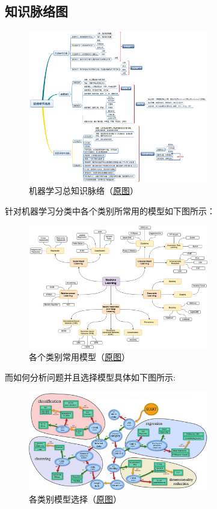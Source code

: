 \documentclass[lang=cn,11pt,a4paper]{eleganttemplate}
\begin{document}
\subsection{知识脉络图}
\begin{figure}[htbp]
  \centering
  \includegraphics[width=0.7\textwidth]{image/ML-1.png}
  \caption{机器学习总知识脉络（\href{https://www.cnblogs.com/wnwin/p/9684520.html}{原图}）}
\end{figure}
针对机器学习分类中各个类别所常用的模型如下图所示：
\begin{figure}[htbp]
  \centering
  \vspace{0cm}
  \includegraphics[width=0.7\textwidth]{image/ML-2.png}
  \caption{各个类别常用模型（\href{https://github.com/trekhleb/machine-learning-octave}{原图}）}
\end{figure}

而如何分析问题并且选择模型具体如下图所示:
\begin{figure}[htbp]
  \centering
  \includegraphics[width=0.7\textwidth]{image/ML-3.png}
  \caption{各类别模型选择（\href{https://scikit-learn.org/stable/tutorial/machine_learning_map/index.html}{原图}）}
\end{figure}
\end{document}
